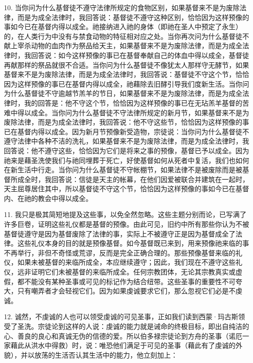 10. 当你问为什么基督徒不遵守法律所规定的食物区别，如果基督来不是为废除法律，而是为成全法律时，我回答说：基督徒不遵守这种区别，恰恰因为这样预像的事如今已在基督内得以成全。祂接纳进入祂的身体（即祂在圣人中预定了永生）的，在人类行为中没有与禁食动物的特征相对应之处。当你再次问为什么基督徒不献上宰杀动物的血肉作为祭品给天主，如果基督来不是为废除法律，而是为成全法律时，我回答说：如今这样预像的事已在基督奉献自己的体血中得以成全，基督徒再献那样的祭品就很不合适。当你问为什么基督徒不像犹太人那样守无酵节，如果基督来不是为废除法律，而是为成全法律时，我回答说：基督徒不守这个节，恰恰因为这样预像的事已在基督内得以成全，祂藉除去旧酵引导我们度新生活。当你问为什么基督徒不守逾越节羔羊的节日，如果基督来不是为废除法律，而是为成全法律时，我的回答是：他不守这个节，恰恰因为这样预像的事已在无玷羔羊基督的苦难中得以成全。当你问为什么基督徒不守法律所规定的新月节，如果基督来不是为废除法律，而是为成全法律时，我回答说：他不守这些节，恰恰因为这样预像的事已在基督内得以成全。因为新月节预像新受造物，宗徒说：当你问为什么基督徒不遵守法律中各种不洁的洗礼，如果基督来不是为废除法律，而是为成全法律时，我回答说：他不遵守这些，恰恰因为它们是将来之事的预像，基督已予以成全。因为祂来是藉圣洗使我们与祂同埋葬于死亡，好使基督如何从死者中复活，我们也如何在新生活中行走。当你问为什么基督徒不守帐棚节，如果法律不是被废除而是被基督所成全时，我回答说：信徒是天主的帐幕，在他们因爱被联合并建筑在一起时，天主屈尊居住其中，所以基督徒不守这个节，恰恰因为这样预像的事如今已在基督内、在祂的教会中得以成全。\par

11. 我只是极其简短地提及这些事，以免全然忽略。这些主题分别而论，已写满了许多巨卷，证明这些礼仪都是基督的预像。由此可见，旧约中所有那些你认为不被基督徒遵守是因为基督废除了法律的事，实际上不被遵守正是因为基督成全了法律。这些礼仪本身的目的就是预像基督。如今基督既已来到，用来预像祂来临的事不再举行，非但不奇怪或荒谬，反而是完全正确合理的。那些预像基督来临的礼仪，如果未被基督的来临所成全，本应继续遵守；因此，我们现在不遵守这些礼仪，远非证明它们未被基督的来临所成全。任何宗教团体，无论其宗教真实或虚假，都不能没有某种圣事或可见的标记作为结合纽带。这些圣事的重要性不可夸大，只有嘲弄者才会轻视它们。因为如果虔诚要求它们，那么忽视它们必是不虔诚。\par

12. 诚然，不虔诚的人也可以领受虔诚的可见圣事，正如我们读到西蒙·玛古斯领受了圣洗。宗徒论到这样的人说：虔诚的能力就是诫命的终极目标，即出自纯洁的心、善良的良心和真诚无伪的信德的爱。所以伯多禄宗徒论到方舟的圣事（诺厄一家藉此从洪水中得救）时，说：唯恐他们满足于可见的圣事（藉此有了虔诚的外貌），并以放荡的生活否认其生活中的能力，他立刻加上：\par

